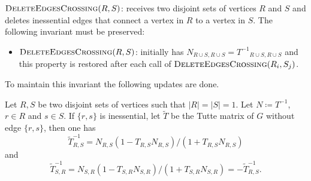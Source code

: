 $\textsc{DeleteEdgesCrossing}(R, S)$: receives two disjoint sets of vertices \(R\) and \(S\) and 
deletes inessential edges that connect a vertex in \(R\) to a vertex in \(S\).
The following invariant must be preserved:
\begin{itemize}
    \item \(\textsc{DeleteEdgesCrossing}(R, S)\): initially has \(N_{R \cup S, R \cup S} = {T^{-1}}_{R \cup S, R \cup S}\) and this property is restored after each call 
    of \(\textsc{DeleteEdgesCrossing}(R_i, S_j)\).
\end{itemize}
To maintain this invariant the following updates are done. 

\begin{theorem}[Update 1]
\label{update:1}
    Let \(R, S\) be two disjoint sets of vertices such that \(|R| = |S| = 1\).
    Let \(N \coloneqq T^{-1}\), \(r \in R\) and \(s \in S\).
    If \(\{r, s\}\) is inessential, let \(\tilde{T}\) be the Tutte matrix of \(G\) without edge \(\{r, s\}\), then one has
    \[
        \tilde{T}^{-1}_{R, S} = N_{R, S} (1 - T_{R, S} N_{R, S}) / (1 + T_{R, S} N_{R, S})
    \]
    and
    \[
        \tilde{T}^{-1}_{S, R} = N_{S, R} (1 - T_{S, R} N_{S, R}) / (1 + T_{S, R} N_{S, R}) = -\tilde{T}^{-1}_{R, S}.
    \]
\end{theorem}

